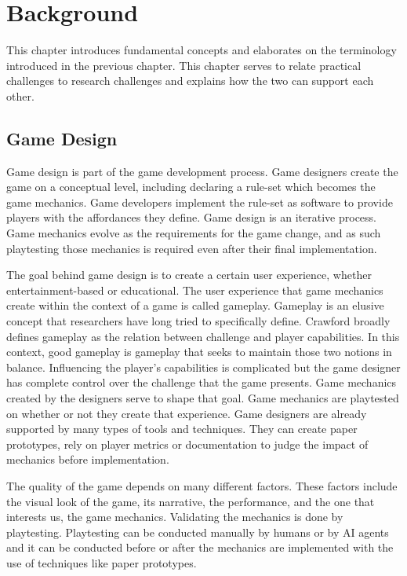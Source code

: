 \chapter{Background}
\label{ch:background}

This chapter introduces fundamental concepts and elaborates on the terminology introduced in the previous chapter. This chapter serves to relate practical challenges to research challenges and explains how the two can support each other.

\section{Game Design}

Game design is part of the game development process. Game designers create the game on a conceptual level, including declaring a rule-set which becomes the game mechanics. Game developers implement the rule-set as software to provide players with the affordances they define. Game design is an iterative process. Game mechanics evolve as the requirements for the game change, and as such playtesting those mechanics is required even after their final implementation.

The goal behind game design is to create a certain user experience, whether entertainment-based or educational. The user experience that game mechanics create within the context of a game is called gameplay. Gameplay is an elusive concept that researchers have long tried to specifically define\cite{DBLP:conf/digra/ErmiM05}. Crawford\cite{10.5555/538111} broadly defines gameplay as the relation between challenge and player capabilities. In this context, good gameplay is gameplay that seeks to maintain those two notions in balance. Influencing the player's capabilities is complicated but the game designer has complete control over the challenge that the game presents. Game mechanics created by the designers serve to shape that goal. Game mechanics are playtested on whether or not they create that experience. Game designers are already supported by many types of tools and techniques. They can create paper prototypes, rely on player metrics or documentation to judge the impact of mechanics before implementation. 

The quality of the game depends on many different factors. These factors include the visual look of the game, its narrative, the performance, and the one that interests us, the game mechanics. Validating the mechanics is done by playtesting. Playtesting can be conducted manually by humans or by AI agents and it can be conducted before or after the mechanics are implemented with the use of techniques like paper prototypes.\cite{10.1201/b22309}

